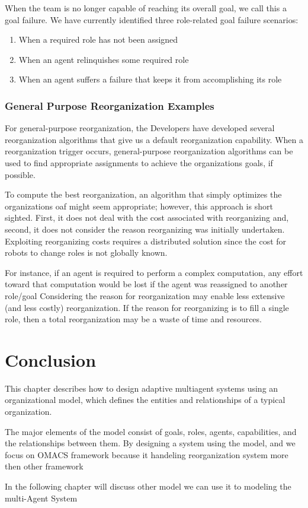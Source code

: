When the team is no longer capable of reaching its overall goal, 
we call this a goal failure. We have currently identified three role-related goal failure
scenarios:\cite{omacs1}

\begin{enumerate}
	\item When a required role has not been assigned
	\item When an agent relinquishes some required role
	\item  When an agent suffers a failure that keeps it from accomplishing its role 
\end{enumerate}
  

\subsubsection{ General Purpose Reorganization Examples }

For general-purpose reorganization, the Developers have developed several reorganization algorithms that
give us a default reorganization capability. When a reorganization trigger occurs, general-purpose
reorganization algorithms can be used to find appropriate assignments to achieve the
organizations goals, if possible. \cite{omacs2}

To compute the best reorganization, an algorithm that simply
optimizes the organizations oaf might seem appropriate; however, this approach is short sighted.
First, it does not deal with the cost associated with reorganizing and, second, it does not consider
the reason reorganizing was initially undertaken. Exploiting reorganizing costs requires a
distributed solution since the cost for robots to change roles is not globally known. 

For instance, if an agent is required to perform a complex computation, any effort toward that computation
would be lost if the agent was reassigned to another role/goal Considering the reason for
reorganization may enable less extensive (and less costly) reorganization. If the reason for
reorganizing is to fill a single role, then a total reorganization may be a waste of time and
resources. \cite{omacs2}

 

\section{Conclusion}

This chapter describes how to design adaptive multiagent
systems using an organizational model, which defines the
entities and relationships of a typical organization.

 The major elements of the model consist of goals, roles, agents,
capabilities, and the relationships between them. By
designing a system using the model, and we focus on OMACS framework
because it handeling reorganization system more then other framework

In the following chapter will discuss other model
we can use it to modeling the multi-Agent System
\textbf{}

